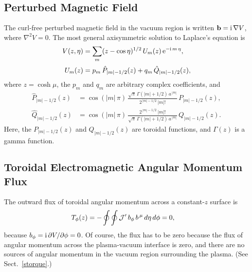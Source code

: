 \documentclass[12pt,prb,aps]{revtex4-1}
\begin{document}
\subsection{Perturbed Magnetic Field}
The curl-free perturbed magnetic field in the vacuum region is written ${\bf b} = {\rm i}\,\nabla V$,
where
$\nabla^2 V =0$.
The most general axisymmetric  solution to Laplace's equation is\,\cite{tj1,mf1}
\begin{align}
V(z,\eta)&= \sum_m (z-\cos\eta)^{1/2}\,U_m(z)\,{\rm e}^{-{\rm i}\,m\,\eta}, \\[0.5ex]
U_m(z) &= p_m\,\hat{P}_{|m|-1/2}(z)+q_m\,\hat{Q}_{|m|-1/2}(z),
\end{align}
where  $z=\cosh\mu$, the $p_m$ and $q_m$ are arbitrary complex coefficients, and 
\begin{align}\label{e21dd}
\hat{P}_{|m|-1/2}(z) &= \cos(|m|\,\pi)\,\frac{\sqrt{\pi}\,\Gamma(|m|+1/2)\,a^{\,|m|}}{2^{\,|m|-1/2}\,|m|!}\,P_{|m|-1/2}(z),\\[0.5ex]
\hat{Q}_{|m|-1/2}(z)&= \cos(|m|\,\pi)\,\frac{2^{\,|m|-1/2}\,|m|!}{\sqrt{\pi}\,\Gamma(|m|+1/2)\,a^{\,|m|}}\,Q_{|m|-1/2}(z).\label{e22dd}
\end{align}
Here,  the $P_{|m|-1/2}(z)$  and $Q_{|m|-1/2}(z)$ are toroidal functions,\cite{as1} and $\Gamma(z)$ is a
gamma function.\cite{as2}

\subsection{Toroidal Electromagnetic Angular Momentum Flux}
The outward flux of toroidal angular momentum across a constant-$z$ surface is\,\cite{tj,tj1}
\begin{align}
T_\phi(z) &= -\oint\oint {\cal J}' \,b_\phi\,b^{\,\mu}\,d\eta\,d\phi = 0,
\end{align}
because $b_\phi = {\rm i}\,\partial V/\partial\phi = 0$. Of course, the flux has to be zero because the flux of angular momentum across the plasma-vacuum
interface is zero, and there are no sources of angular momentum in the vacuum region surrounding the plasma. (See Sect.~\ref{storque}.)
\end{document}
